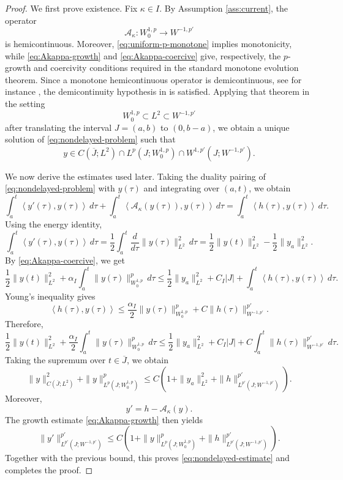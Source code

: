 \documentclass[a4paper,11pt,oneside,reqno]{amsart}
\newcounter{c}
\newcounter{d}
\newcounter{b}
\newcommand{\dual}[2]{\left\langle #1,#2\right\rangle}
\begin{document}
\begin{proof}
We first prove existence. Fix \(\kappa\in I\). By Assumption
\ref{ass:current}, the operator
\[
 \mathcal A_\kappa:W^{1,p}_0\to W^{-1,p'}
\]
is hemicontinuous. Moreover, \eqref{eq:uniform-p-monotone} implies
monotonicity, while \eqref{eq:Akappa-growth} and
\eqref{eq:Akappa-coercive} give, respectively, the \(p\)-growth and
coercivity conditions required in the standard monotone evolution theorem.
Since a monotone hemicontinuous operator is demicontinuous, see for instance
\cite[Chapter~II, Section~2]{Showalter1997MonotoneOperatorsBanachSpaceNonlinearPDE}, the demicontinuity hypothesis in
\cite[Theorem~4.10]{Barbu2010NonlinearDifferentialEquationsMonotoneTypesBanachSpaces} is satisfied.  Applying that theorem in the
setting
\[
 W^{1,p}_0\subset L^2\subset W^{-1,p'}
\]
after translating the interval \(J=(a,b)\) to \((0,b-a)\), we obtain a unique
solution of \eqref{eq:nondelayed-problem} such that
\[
y\in C(\overline J;L^2) \cap L^p(J;W^{1,p}_0) \cap W^{1,p'}(J;W^{-1,p'}).
\]

We now derive the estimates used later. Taking the duality pairing of
\eqref{eq:nondelayed-problem} with \(y(\tau)\) and integrating over
\((a,t)\), we obtain
\[
 \int_a^t\dual{y'(\tau)}{y(\tau)}\,d\tau
 +\int_a^t\dual{\mathcal A_\kappa(y(\tau))}{y(\tau)}\,d\tau
 =
 \int_a^t\dual{h(\tau)}{y(\tau)}\,d\tau .
\]
Using the energy identity,
\[
 \int_a^t\dual{y'(\tau)}{y(\tau)}\,d\tau
 =
 \frac12\int_a^t
 \frac{d}{d\tau}\|y(\tau)\|_{L^2}^2\,d\tau
 =
 \frac12\|y(t)\|_{L^2}^2
 -\frac12\|y_a\|_{L^2}^2 .
\]
By \eqref{eq:Akappa-coercive}, we get
\[
 \frac12\|y(t)\|_{L^2}^2
 +\alpha_I\int_a^t\|y(\tau)\|_{W^{1,p}_0}^p\,d\tau
 \le
 \frac12\|y_a\|_{L^2}^2
 +C_I|J|
 +\int_a^t\dual{h(\tau)}{y(\tau)}\,d\tau .
\]
Young's inequality gives
\[
 \dual{h(\tau)}{y(\tau)}
 \le
 \frac{\alpha_I}{2}\|y(\tau)\|_{W^{1,p}_0}^p
 +C\|h(\tau)\|_{W^{-1,p'}}^{p'} .
\]
Therefore,
\[
 \frac12\|y(t)\|_{L^2}^2
 +\frac{\alpha_I}{2}
 \int_a^t\|y(\tau)\|_{W^{1,p}_0}^p\,d\tau
 \le
 \frac12\|y_a\|_{L^2}^2
 +C_I|J|
 +C\int_a^t\|h(\tau)\|_{W^{-1,p'}}^{p'}\,d\tau .
\]
Taking the supremum over \(t\in\overline J\), we obtain
\[
 \|y\|_{C(\overline J;L^2)}^2
 +\|y\|_{L^p(J;W^{1,p}_0)}^p
 \le
 C \left(
 1+\|y_a\|_{L^2}^2
 +\|h\|_{L^{p'}(J;W^{-1,p'})}^{p'}
 \right).
\]
Moreover,
\[
 y'=h-\mathcal A_\kappa(y).
\]
The growth estimate \eqref{eq:Akappa-growth} then yields
\[
 \|y'\|_{L^{p'}(J;W^{-1,p'})}^{p'}
 \le
 C\left(
 1+\|y\|_{L^p(J;W^{1,p}_0)}^p
 +\|h\|_{L^{p'}(J;W^{-1,p'})}^{p'}
 \right).
\]
Together with the previous bound, this proves
\eqref{eq:nondelayed-estimate} and completes the proof.
\end{proof}
\end{document}

